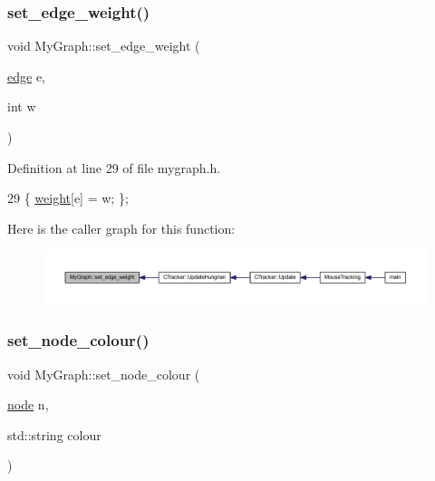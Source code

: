 \subsubsection{\texorpdfstring{set\+\_\+edge\+\_\+weight()}{set\_edge\_weight()}}
{\footnotesize\ttfamily void My\+Graph\+::set\+\_\+edge\+\_\+weight (\begin{DoxyParamCaption}\item[{\mbox{\hyperlink{classedge}{edge}}}]{e,  }\item[{int}]{w }\end{DoxyParamCaption})\hspace{0.3cm}{\ttfamily [inline]}}



Definition at line 29 of file mygraph.\+h.


\begin{DoxyCode}
29 \{ \mbox{\hyperlink{class_my_graph_aa6e12f16153220780e9db1eb30112b34}{weight}}[e] = w; \};
\end{DoxyCode}
Here is the caller graph for this function\+:
\nopagebreak
\begin{figure}[H]
\begin{center}
\leavevmode
\includegraphics[width=350pt]{class_my_graph_a798846d9c09d7d5b49db3c75fb1f7f38_icgraph}
\end{center}
\end{figure}
\mbox{\label{class_my_graph_a4cada42859b2a657637e81eef7c6e4ab}} 
\subsubsection{\texorpdfstring{set\+\_\+node\+\_\+colour()}{set\_node\_colour()}}
{\footnotesize\ttfamily void My\+Graph\+::set\+\_\+node\+\_\+colour (\begin{DoxyParamCaption}\item[{\mbox{\hyperlink{classnode}{node}}}]{n,  }\item[{std\+::string}]{colour }\end{DoxyParamCaption})\hspace{0.3cm}{\ttfamily [inline]}}



